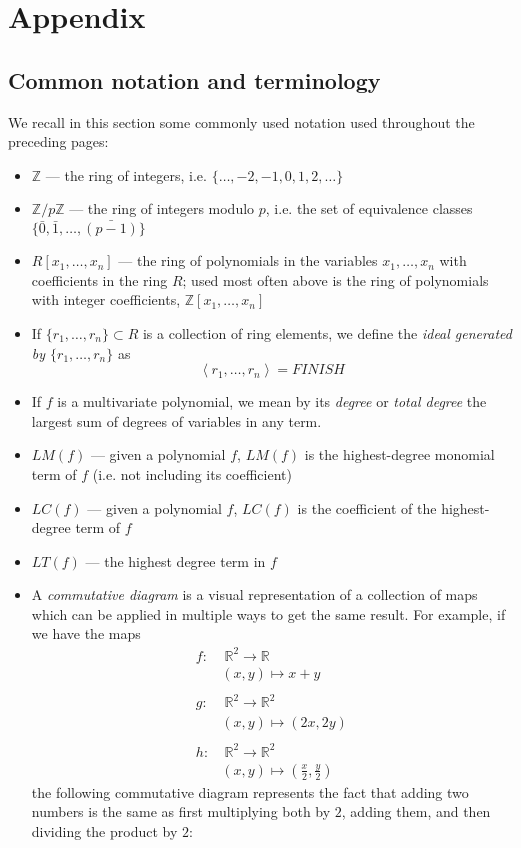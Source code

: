 \documentclass[11pt]{report}
\newcommand{\Z}{\mathbb{Z}}
\newcommand{\R}{\mathbb{R}}
\newcommand{\Zp}{\mathbb{Z}/p\mathbb{Z}}
\newcommand{\lra}{\longrightarrow}
\begin{document}
\chapter{Appendix}

\section{Common notation and terminology}

We recall in this section some commonly used notation used throughout the preceding pages:

\begin{itemize}
\item $\Z$ --- the ring of integers, i.e. $\{\dots,  -2, -1, 0, 1, 2, \dots\}$
\item $\Zp$ --- the ring of integers modulo $p$, i.e. the set of equivalence classes $\{\bar{0}, \bar{1}, \dots , \bar{(p-1)}\}$
\item $R[x_1, \dots ,x_n]$ --- the ring of polynomials in the variables $x_1,\dots, x_n$ with coefficients in the ring $R$; used most often above is the ring of polynomials with integer coefficients, $\Z[x_1,\dots,x_n]$
\item If $\{r_1,\dots,r_n\} \subset R$ is a collection of ring elements, we define the \emph{ideal generated by $\{r_1,\dots,r_n\}$} as
\[ \left\langle r_1,\dots, r_n\right\rangle = FINISH \]
\item If $f$ is a multivariate polynomial, we mean by its \emph{degree} or \emph{total degree} the largest sum of degrees of variables in any term.
\item $LM(f)$ --- given a polynomial $f$, $LM(f)$ is the highest-degree monomial term of $f$ (i.e. not including its coefficient)
\item $LC(f)$ --- given a polynomial $f$, $LC(f)$ is the coefficient of the highest-degree term of $f$
\item $LT(f)$ --- the highest degree term in $f$
\item A \emph{commutative diagram} is a visual representation of a collection of maps which can be applied in multiple ways to get the same result. For example, if we have the maps 
\begin{align*}
f: & \ \R^2 \lra \R\\
&(x,y)\mapsto x+y\\
\\
g : & \ \R^2 \lra \R^2\\
&(x,y)\mapsto (2x,2y)\\
\\
h : & \ \R^2\lra \R^2\\
&(x,y)\mapsto (\frac{x}{2},\frac{y}{2})
\end{align*}
the following commutative diagram represents the fact that adding two numbers is the same as first multiplying both by $2$, adding them, and then dividing the product by $2$:



\end{itemize}
\end{document}
